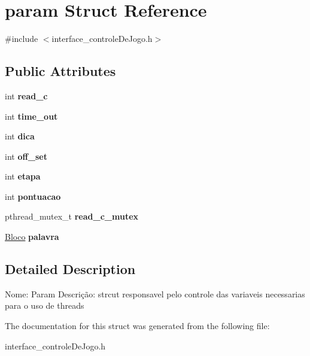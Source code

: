 \hypertarget{structparam}{\section{param Struct Reference}
\label{structparam}
}


{\ttfamily \#include $<$interface\-\_\-controle\-De\-Jogo.\-h$>$}

\subsection*{Public Attributes}
\begin{DoxyCompactItemize}
\item 
\hypertarget{structparam_a7f4c920215b76074ad039cf691df37a2}{int {\bfseries read\-\_\-c}}\label{structparam_a7f4c920215b76074ad039cf691df37a2}

\item 
\hypertarget{structparam_aae78226a5885348ce41e4aca55352a60}{int {\bfseries time\-\_\-out}}\label{structparam_aae78226a5885348ce41e4aca55352a60}

\item 
\hypertarget{structparam_a5abcdc1e1cf6dd62e3b78960f4c67a7a}{int {\bfseries dica}}\label{structparam_a5abcdc1e1cf6dd62e3b78960f4c67a7a}

\item 
\hypertarget{structparam_a331057ead3dee58a78f01cbc9891f244}{int {\bfseries off\-\_\-set}}\label{structparam_a331057ead3dee58a78f01cbc9891f244}

\item 
\hypertarget{structparam_acd22c3fddeedcd5bd0f716f25c496bd7}{int {\bfseries etapa}}\label{structparam_acd22c3fddeedcd5bd0f716f25c496bd7}

\item 
\hypertarget{structparam_af2616b9ec94efa0f36f2d6f7592f9dc2}{int {\bfseries pontuacao}}\label{structparam_af2616b9ec94efa0f36f2d6f7592f9dc2}

\item 
\hypertarget{structparam_a1a25308c13bafb7817f2b359a5936693}{pthread\-\_\-mutex\-\_\-t {\bfseries read\-\_\-c\-\_\-mutex}}\label{structparam_a1a25308c13bafb7817f2b359a5936693}

\item 
\hypertarget{structparam_a38ba4bab4df686424094ed9c7c853c7d}{\hyperlink{structbloco}{Bloco} {\bfseries palavra}}\label{structparam_a38ba4bab4df686424094ed9c7c853c7d}

\end{DoxyCompactItemize}


\subsection{Detailed Description}
Nome\-: Param Descrição\-: strcut responsavel pelo controle das variaveis necessarias para o uso de threads 

The documentation for this struct was generated from the following file\-:\begin{DoxyCompactItemize}
\item 
interface\-\_\-controle\-De\-Jogo.\-h\end{DoxyCompactItemize}
